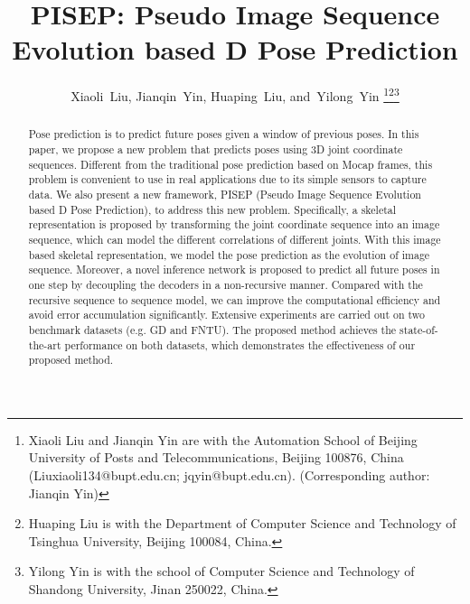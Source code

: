 \documentclass[journal]{IEEEtran}
\begin{document}
\title{PISEP: Pseudo Image Sequence Evolution based D Pose Prediction}


\author{Xiaoli~Liu,
        Jianqin~Yin,
        Huaping~Liu,
        and~Yilong~Yin \thanks{Xiaoli Liu and Jianqin Yin are with the Automation School of Beijing University of Posts
and Telecommunications, Beijing 100876, China (Liuxiaoli134@bupt.edu.cn; jqyin@bupt.edu.cn). (Corresponding author: Jianqin Yin)}\thanks{Huaping Liu is with the Department of Computer Science and Technology of Tsinghua University, Beijing 100084, China.}\thanks{Yilong Yin is with the school of Computer Science and Technology of
Shandong University, Jinan 250022, China.}}



















\maketitle

\begin{abstract}
Pose prediction is to predict future poses given a window of previous poses. In this paper, we propose a new problem that predicts poses using 3D joint coordinate sequences. Different from the traditional pose prediction based on Mocap frames, this problem is convenient to use in real applications due to its simple sensors to capture data. We also present a new framework, PISEP (Pseudo Image Sequence Evolution based D Pose Prediction), to address this new problem. Specifically, a skeletal representation is proposed by transforming the joint coordinate sequence into an image sequence, which can model the different correlations of different joints. With this image based skeletal representation, we model the pose prediction as the evolution of image sequence. Moreover, a novel inference network is proposed to predict all future poses in one step by decoupling the decoders in a non-recursive manner. Compared with the recursive sequence to sequence model, we can improve the computational efficiency and avoid error accumulation significantly. Extensive experiments are carried out on two benchmark datasets (e.g. GD and FNTU). The proposed method achieves the state-of-the-art performance on both datasets, which demonstrates the effectiveness of our proposed method.
\end{abstract}
\end{document}
